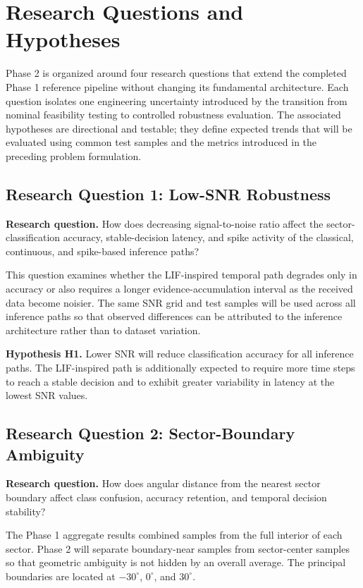 \section{Research Questions and Hypotheses}

Phase 2 is organized around four research questions that extend the completed Phase 1 reference pipeline without changing its fundamental architecture. Each question isolates one engineering uncertainty introduced by the transition from nominal feasibility testing to controlled robustness evaluation. The associated hypotheses are directional and testable; they define expected trends that will be evaluated using common test samples and the metrics introduced in the preceding problem formulation.

\subsection{Research Question 1: Low-SNR Robustness}

\textbf{Research question.} How does decreasing signal-to-noise ratio affect the sector-classification accuracy, stable-decision latency, and spike activity of the classical, continuous, and spike-based inference paths?

This question examines whether the LIF-inspired temporal path degrades only in accuracy or also requires a longer evidence-accumulation interval as the received data become noisier. The same SNR grid and test samples will be used across all inference paths so that observed differences can be attributed to the inference architecture rather than to dataset variation.

\textbf{Hypothesis H1.} Lower SNR will reduce classification accuracy for all inference paths. The LIF-inspired path is additionally expected to require more time steps to reach a stable decision and to exhibit greater variability in latency at the lowest SNR values.

\subsection{Research Question 2: Sector-Boundary Ambiguity}

\textbf{Research question.} How does angular distance from the nearest sector boundary affect class confusion, accuracy retention, and temporal decision stability?

The Phase 1 aggregate results combined samples from the full interior of each sector. Phase 2 will separate boundary-near samples from sector-center samples so that geometric ambiguity is not hidden by an overall average. The principal boundaries are located at $-30^{\circ}$, $0^{\circ}$, and $30^{\circ}$.

